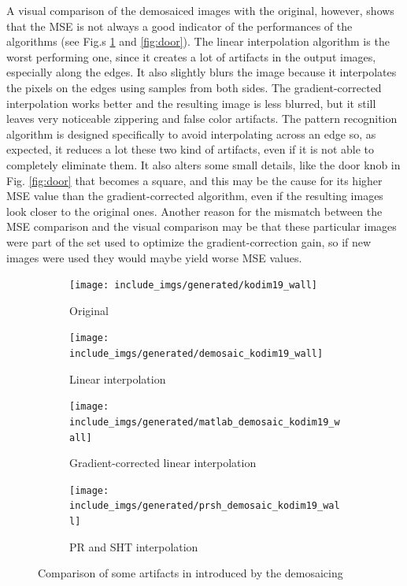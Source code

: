 \documentclass[a4paper,oneside]{article}
\begin{document}
A visual comparison of the demosaiced images with the original,
however, shows that the MSE is not always a good indicator of the
performances of the algorithms (see Fig.s \ref{fig:wall} and
\ref{fig:door}).
%
The linear interpolation algorithm is the worst performing one, since
it creates a lot of artifacts in the output images, especially along
the edges. It also slightly blurs the image because it interpolates
the pixels on the edges using samples from both sides.
%
The gradient-corrected interpolation works better and the resulting
image is less blurred, but it still leaves very noticeable zippering
and false color artifacts.
%
The pattern recognition algorithm is designed specifically to avoid
interpolating across an edge so, as expected, it reduces a lot these
two kind of artifacts, even if it is not able to completely eliminate
them.
%
It also alters some small details, like the door knob in
Fig. \ref{fig:door} that becomes a square, and this may be the cause
for its higher MSE value than the gradient-corrected algorithm, even
if the resulting images look closer to the original ones.
%
Another reason for the mismatch between the MSE comparison and the
visual comparison may be that these particular images were part of the
set used to optimize the gradient-correction gain, so if new images
were used they would maybe yield worse MSE values.
\begin{figure}[htbp]
  \centering
  \begin{subfigure}{0.4\textwidth}
    \centering
    \texttt{[image: include\_imgs/generated/kodim19\_wall]}
    \caption{Original}
  \end{subfigure}%
  \begin{subfigure}{0.4\textwidth}
    \centering
    \texttt{[image: include\_imgs/generated/demosaic\_kodim19\_wall]}
    \caption{Linear interpolation}
  \end{subfigure}
  \begin{subfigure}{0.4\textwidth}
    \centering
    \texttt{[image: include\_imgs/generated/matlab\_demosaic\_kodim19\_wall]}
    \caption{Gradient-corrected linear interpolation}
  \end{subfigure}%
  \begin{subfigure}{0.4\textwidth}
    \centering
    \texttt{[image: include\_imgs/generated/prsh\_demosaic\_kodim19\_wall]}
    \caption{PR and SHT interpolation}
  \end{subfigure}
  \caption{Comparison of some artifacts in 
    introduced by the demosaicing}
  \label{fig:wall}
\end{figure}
\end{document}
